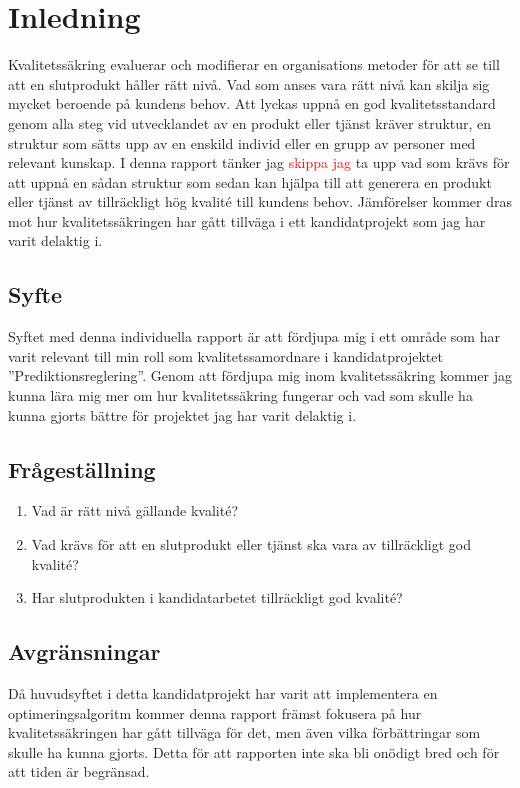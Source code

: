 \section{Inledning}
Kvalitetssäkring evaluerar och modifierar en organisations metoder för att se till att en slutprodukt håller rätt nivå. Vad som anses vara rätt nivå kan skilja sig mycket beroende på kundens behov. 
\newline
\newline
Att lyckas uppnå en god kvalitetsstandard genom alla steg vid utvecklandet av en produkt eller tjänst kräver struktur, en struktur som sätts upp av en enskild individ eller en grupp av personer med relevant kunskap. I denna rapport tänker jag\textcolor{red}{ skippa jag } ta upp vad som krävs för att uppnå en sådan struktur som sedan kan hjälpa till att generera en produkt eller tjänst av tillräckligt hög kvalité till kundens behov. Jämförelser kommer dras mot hur kvalitetssäkringen har gått tillväga i ett kandidatprojekt som jag har varit delaktig i.

\subsection{Syfte}
Syftet med denna individuella rapport är att fördjupa mig i ett område som har varit relevant till min roll som kvalitetssamordnare i kandidatprojektet ''Prediktionsreglering''. 
\newline
\newline
Genom att fördjupa mig inom kvalitetssäkring kommer jag kunna lära mig mer om hur kvalitetssäkring fungerar och vad som skulle ha kunna gjorts bättre för projektet jag har varit delaktig i.

\subsection{Frågeställning}

\begin{enumerate}
  \item Vad är rätt nivå gällande kvalité?
  \item Vad krävs för att en slutprodukt eller tjänst ska vara av tillräckligt god kvalité?
  \item Har slutprodukten i kandidatarbetet tillräckligt god kvalité?
\end{enumerate}

\subsection{Avgränsningar}

Då huvudsyftet i detta kandidatprojekt har varit att implementera en optimeringsalgoritm kommer denna rapport främst fokusera på hur kvalitetssäkringen har gått tillväga för det, men även vilka förbättringar som skulle ha kunna gjorts. Detta för att rapporten inte ska bli onödigt bred och för att tiden är begränsad.


